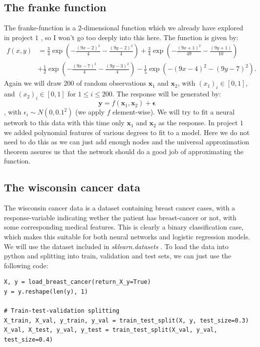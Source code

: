 \documentclass{article}
\begin{document}
\subsection{The franke function}
The franke-function is a $2$-dimensional function which we already have explored
in project $1$ \cite{githubrepoproject1}, so I won't go too deeply into this
here. The function is given by:
\begin{align*}
      f(x,y) & = \frac{3}{4}\exp{\left(-\frac{(9x-2)^2}{4} - \frac{(9y-2)^2}{4}\right)}+\frac{3}{4}\exp{\left(-\frac{(9x+1)^2}{49}- \frac{(9y+1)}{10}\right)} \\
             & +\frac{1}{2}\exp{\left(-\frac{(9x-7)^2}{4} - \frac{(9y-3)^2}{4}\right)} -\frac{1}{5}\exp{\left(-(9x-4)^2 - (9y-7)^2\right) }.
\end{align*}
Again we will draw 200 of random observations $\bm{x}_1$ and $\bm{x}_2$, with
$(x_1)_i \in [0, 1]$, and $(x_2)_i \in [0, 1]$ for $1 \leq i \leq 200$. The response will be generated by:
$$\bm{y} = f(\bm{x}_1, \bm{x}_2) + \bm{\epsilon}$$
, with $\epsilon_i \sim N(0, 0.1^2)$ (we apply $f$ element-wise). We will try to
fit a neural network to this data with this time only $\bm{x}_1$ and $\bm{x}_2$
as the response. In project $1$ we added polynomial features of various degrees
to fit to a model. Here we do not need to do this as we can just add enough
nodes and the universal approximation theorem assures us that the network should
do a good job of approximating the function.

\subsection{The wisconsin cancer data}
The wisconsin cancer data \cite{breastcancerwisconsin} is a dataset containing
breast cancer cases, with a response-variable indicating wether the patient has
breast-cancer or not, with some corresponding medical features. This is clearly
a binary classification case, which makes this suitable for both neural networks
and logistic regression models. We will use the dataset included in
\textit{sklearn.datasets} \cite{sklearncancerdata}. To load the data into python
and splitting into train, validation and test sets, we can just use the
following code:

\begin{lstlisting}
X, y = load_breast_cancer(return_X_y=True)
y = y.reshape(len(y), 1)

# Train-test-validation splitting
X_train, X_val, y_train, y_val = train_test_split(X, y, test_size=0.3)
X_val, X_test, y_val, y_test = train_test_split(X_val, y_val, test_size=0.4)
\end{lstlisting}
\end{document}
